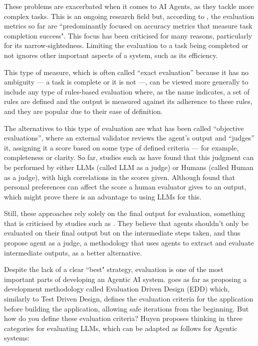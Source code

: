 \documentclass[a4paper]{report}
\begin{document}
These problems are exacerbated when it comes to AI Agents, as they tackle more complex tasks. This is an ongoing research field but, according to \cite{krishnan2025aiagentsevolutionarchitecture}, the evaluation metrics so far are ``predominantly focused on accuracy metrics that measure task completion success". This focus has been criticised for many reasons, particularly for its narrow-sightedness. Limiting the evaluation to a task being completed or not ignores other important aspects of a system, such as its efficiency.

This type of measure, which is often called ``exact evaluation'' because it has no ambiguity --- a task is complete or it is not ---, can be viewed more generally to include any type of rules-based evaluation where, as the name indicates, a set of rules are defined and the output is measured against its adherence to these rules, and they are popular due to their ease of definition.

The alternatives to this type of evaluation are what has been called ``objective evaluations'', where an external validator reviews the agent's output and ``judges'' it, assigning it a score based on some type of defined criteria --- for example, completeness or clarity. So far, studies such as \cite{wang2025replacehumanevaluators} have found that this judgment can be performed by either LLMs (called LLM as a judge) or Humans (called Human as a judge), with high correlations in the scores given. Although \cite{hu2023decipher} found that personal preferences can affect the score a human evaluator gives to an output, which might prove there is an advantage to using LLMs for this.

Still, these approaches rely solely on the final output for evaluation, something that is criticised by studies such as \cite{zhuge2024agentasajudgeevaluateagentsagents}. They believe that agents shouldn't only be evaluated on their final output but on the intermediate steps taken, and thus propose agent as a judge, a methodology that uses agents to extract and evaluate intermediate outputs, as a better alternative.

Despite the lack of a clear ``best" strategy, evaluation is one of the most important parts of developing an Agentic AI system. \cite{aiebook2025} goes as far as proposing a development methodology called Evaluation Driven Design (EDD) which, similarly to Test Driven Design, defines the evaluation criteria for the application before building the application, allowing safe iterations from the beginning. But how do you define these evaluation criteria? Huyen proposes thinking in three categories for evaluating LLMs, which can be adapted as follows for Agentic systems:
\end{document}
